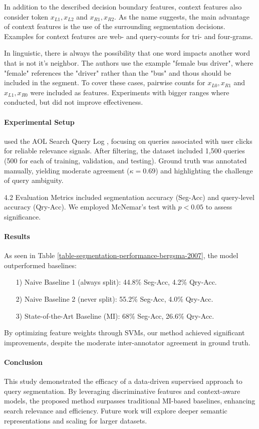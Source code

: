 In addition to the described decision boundary features, context features also consider token $x_{L1}, x_{L2}$ and $x_{R1}, x_{R2}$. As the name suggests, the main advantage of context features is the use of the surrounding segmentation decisions. Examples for context features are web- and query-counts for tri- and four-grams.

In linguistic, there is always the possibility that one word impacts another word that is not it's neighbor. The authors use the example "female bus driver", where "female" references the "driver" rather than the "bus" and thous should be included in the segment. To cover these cases, pairwise counts for $x_{L0},x_{R1}$ and $x_{L1},x_{R0}$ were included as features. Experiments with bigger ranges where conducted, but did not improve effectiveness.

\paragraph*{Experimental Setup}
\citeauthor{Bergsma:2007} used the AOL Search Query Log \cite{Pass:2006}, focusing on queries associated with user clicks for reliable relevance signals. After filtering, the dataset included 1,500 queries (500 for each of training, validation, and testing). Ground truth was annotated manually, yielding moderate agreement ($\kappa=0.69$) and highlighting the challenge of query ambiguity.

4.2 Evaluation
Metrics included segmentation accuracy (Seg-Acc) and query-level accuracy (Qry-Acc). We employed McNemar's test with $p<0.05$ to assess significance.



\paragraph*{Results}
As seen in Table \ref{table-segmentation-performance-bergsma-2007}, the model outperformed baselines:
\begin{enumerate}
\item[1)] Naive Baseline 1 (always split): 44.8\% Seg-Acc, 4.2\% Qry-Acc.
\item[2)] Naive Baseline 2 (never split): 55.2\% Seg-Acc, 4.0\% Qry-Acc.
\item[3)] State-of-the-Art Baseline (MI): 68\% Seg-Acc, 26.6\% Qry-Acc.
\end{enumerate}
By optimizing feature weights through SVMs, our method achieved significant improvements, despite the moderate inter-annotator agreement in ground truth.

\paragraph*{Conclusion}
This study demonstrated the efficacy of a data-driven supervised approach to query segmentation. By leveraging discriminative features and context-aware models, the proposed method surpasses traditional MI-based baselines, enhancing search relevance and efficiency. Future work will explore deeper semantic representations and scaling for larger datasets.